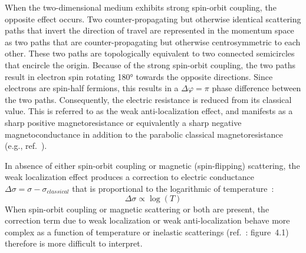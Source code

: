 When the two-dimensional medium exhibits strong spin-orbit coupling, the opposite effect occurs. Two counter-propagating but otherwise identical scattering paths that invert the direction of travel are represented in the momentum space as two paths that are counter-propagating but otherwise centrosymmetric to each other. These two paths are topologically equivalent to two connected semicircles that encircle the origin. Because of the strong spin-orbit coupling, the two paths result in electron spin rotating \ang{180} towards the opposite directions. Since electrons are spin-half fermions, this results in a $\Delta\varphi=\pi$ phase difference between the two paths. Consequently, the electric resistance is reduced from its classical value. This is referred to as the weak anti-localization effect, and manifests as a sharp positive magnetoresistance or equivalently a sharp negative magnetoconductance in addition to the parabolic classical magnetoresistance (e.g., ref.~\cite{TI_WAL_Hongkong}).

In absence of either spin-orbit coupling or magnetic (spin-flipping) scattering, the weak localization effect produces a correction to electric conductance $\Delta\sigma = \sigma - \sigma_{classical}$ that is proportional to the logarithmic of temperature~\cite{anderson1979, dolan1979}:%
\begin{equation}\label{eq:wl_T}
    \Delta\sigma \propto \log(T)
\end{equation}%
When spin-orbit coupling or magnetic scattering or both are present, the correction term due to weak localization or weak anti-localization behave more complex as a function of temperature or inelastic scatterings (ref.~\cite{bergmann1984}: figure~4.1) therefore is more difficult to interpret.

